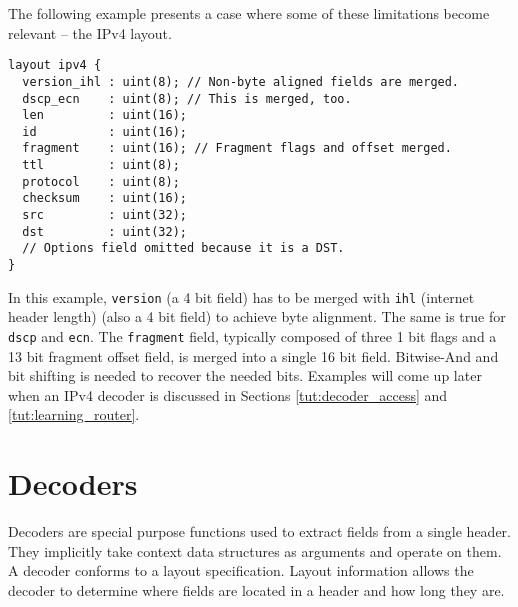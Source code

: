 The following example presents a case where some of these limitations become relevant -- the IPv4 layout.

\begin{codepage}
\begin{lstlisting}
layout ipv4 {
  version_ihl : uint(8); // Non-byte aligned fields are merged.
  dscp_ecn    : uint(8); // This is merged, too.
  len         : uint(16);
  id          : uint(16);
  fragment    : uint(16); // Fragment flags and offset merged.
  ttl         : uint(8);
  protocol    : uint(8);
  checksum    : uint(16);
  src         : uint(32);
  dst         : uint(32);
  // Options field omitted because it is a DST.
}
\end{lstlisting}
\end{codepage}

In this example, \texttt{version} (a 4 bit field) has to be
merged with \texttt{ihl} (internet header length) (also a 4 bit field) to
achieve byte alignment. The same is true for \texttt{dscp} and \texttt{ecn}. The
\texttt{fragment} field, typically composed of three 1 bit flags and a 13 bit
fragment offset field, is merged into a single 16 bit field. 
Bitwise-And and bit shifting is needed to recover the needed bits.
Examples will come up later when an IPv4 decoder is discussed in
Sections \ref{tut:decoder_access} and \ref{tut:learning_router}.

\section{Decoders} \label{tut:decoder}

Decoders are special purpose functions
used to extract fields from a single header. 
They implicitly take context data structures as arguments and 
operate on them.
A decoder conforms to a layout specification.
Layout information allows the decoder to determine where fields
are located in a header and how long they are.


%
%
%
%

